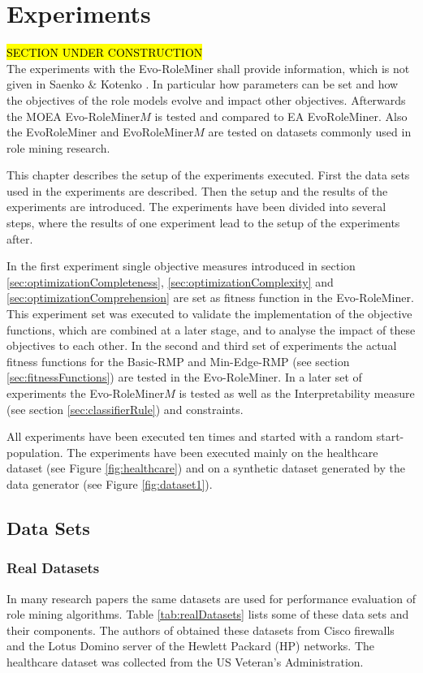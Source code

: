 \newpage
\chapter{Experiments}
\label{sec:experiments}
\hl{SECTION UNDER CONSTRUCTION}\\
The experiments with the Evo-RoleMiner shall provide information, which is not given in Saenko \& Kotenko \cite{saenko2012design}. In particular how parameters can be set and how the objectives of the role models evolve and impact other objectives. Afterwards the MOEA Evo-RoleMiner$M$ is tested and compared to EA EvoRoleMiner. Also the EvoRoleMiner and EvoRoleMiner$M$ are tested on datasets commonly used in role mining research.

This chapter describes the setup of the experiments executed. First the data sets used in the experiments are described. Then the setup and the results of the experiments are introduced. The experiments have been divided into several steps, where the results of one experiment lead to the setup of the experiments after.

In the first experiment  single objective measures introduced in section \ref{sec:optimizationCompleteness}, \ref{sec:optimizationComplexity} and \ref{sec:optimizationComprehension} are set as fitness function in the Evo-RoleMiner. This experiment set was executed to validate the implementation of the objective functions, which are combined at a later stage, and to analyse the impact of these objectives to each other. In the second and third set of experiments the actual fitness functions for the Basic-RMP and Min-Edge-RMP (see section \ref{sec:fitnessFunctions}) are tested in the Evo-RoleMiner. In a later set of experiments the Evo-RoleMiner$M$ is tested as well as the Interpretability measure (see section \ref{sec:classifierRule}) and constraints.

All experiments have been executed ten times and started with a random start-population. The experiments have been executed mainly on the healthcare dataset (see Figure \ref{fig:healthcare}) and on a synthetic dataset generated by the data generator (see Figure \ref{fig:dataset1}).

\section{Data Sets}
\subsection{Real Datasets}
In many research papers the same datasets are used for performance evaluation of role mining algorithms. Table \ref{tab:realDatasets} lists some of these data sets and their components. The authors of \cite{Ene} obtained these datasets from Cisco firewalls and the Lotus Domino server of the Hewlett Packard (HP) networks. The healthcare dataset was collected from the US Veteran’s Administration.

